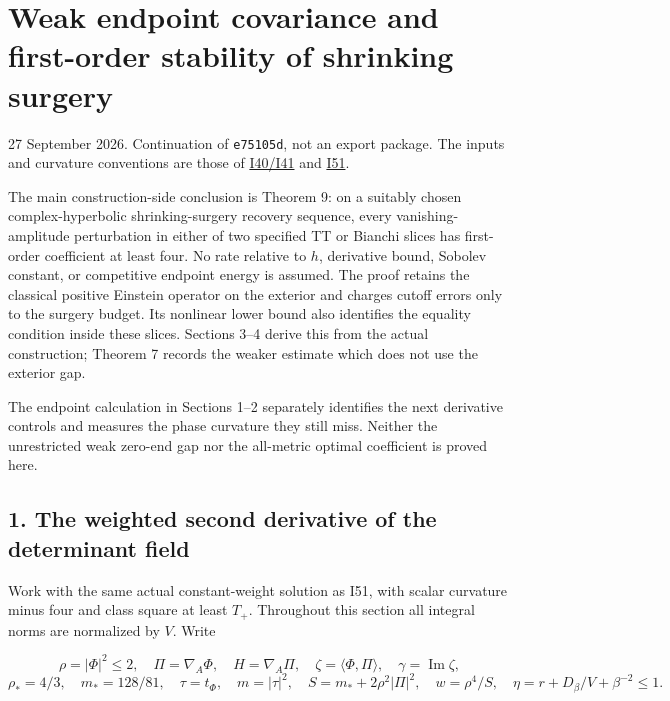 \documentclass[
  11pt,
]{article}
\author{}
\date{}
\begin{document}
\hypertarget{weak-endpoint-covariance-and-first-order-stability-of-shrinking-surgery}{%
\section{Weak endpoint covariance and first-order stability of shrinking
surgery}\label{weak-endpoint-covariance-and-first-order-stability-of-shrinking-surgery}}

27 September 2026. Continuation of \texttt{e75105d}, not an export
package. The inputs and curvature conventions are those of
\href{20260927_conformal_separation_and_zero_end.md}{I40/I41} and
\href{20260927_constant_weight_and_global_fit.md}{I51}.

The main construction-side conclusion is Theorem 9: on a suitably chosen
complex-hyperbolic shrinking-surgery recovery sequence, every
vanishing-amplitude perturbation in either of two specified TT or
Bianchi slices has first-order coefficient at least four. No rate
relative to \(h\), derivative bound, Sobolev constant, or competitive
endpoint energy is assumed. The proof retains the classical positive
Einstein operator on the exterior and charges cutoff errors only to the
surgery budget. Its nonlinear lower bound also identifies the equality
condition inside these slices. Sections 3--4 derive this from the actual
construction; Theorem 7 records the weaker estimate which does not use
the exterior gap.

The endpoint calculation in Sections 1--2 separately identifies the next
derivative controls and measures the phase curvature they still miss.
Neither the unrestricted weak zero-end gap nor the all-metric optimal
coefficient is proved here.

\hypertarget{the-weighted-second-derivative-of-the-determinant-field}{%
\subsection{1. The weighted second derivative of the determinant
field}\label{the-weighted-second-derivative-of-the-determinant-field}}

Work with the same actual constant-weight solution as I51, with scalar
curvature minus four and class square at least \(T_+\). Throughout this
section all integral norms are normalized by \(V\). Write

\[
 \rho=|\Phi|^2\le2,\quad \Pi=\nabla_A\Phi,\quad H=\nabla_A\Pi,
 \quad \zeta=\langle\Phi,\Pi\rangle,\quad\gamma=\operatorname{Im}\zeta,
\] \[
 \rho_*=4/3,\quad m_*=128/81,\quad
 \tau=t_\Phi,\quad m=|\tau|^2,\quad
 S=m_*+2\rho^2|\Pi|^2,\quad w=\rho^4/S,
 \quad \eta=r+D_\beta/V+\beta^{-2}\le1.
\]
\end{document}

